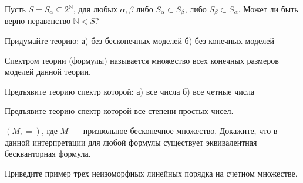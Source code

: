 \setcounter{curtask}{14}



\begin{task}
    Пусть $S = {S_{\alpha} \subseteq 2^{\mathbb{N}}}$, для любых $\alpha, \beta$ либо
    $S_{\alpha} \subset S_{\beta}$, либо $S_{\beta} \subset S_{\alpha}$. Может ли
    быть верно неравенство $\mathbb{N} < S$?
\end{task}

\begin{task}
    Придумайте теорию:
    а) без бесконечных моделей
    б) без конечных моделей
\end{task}

Спектром теории (формулы) называется множество всех конечных размеров моделей данной
теории.

\begin{task}
    Предъявите теорию спектр которой:
    а) все числа
    б) все четные числа
\end{task}

\begin{task}
    Предъявите теорию спектр которой все степени простых чисел.
\end{task}

\begin{task}
    $(M, =)$, где $M$~--- призвольное бесконечное множество. Докажите, что в данной
    интерпретации для любой формулы существует эквивалентная бескванторная формула.
\end{task}

\begin{task}
    Приведите пример трех неизоморфных линейных порядка на счетном множестве.
\end{task}